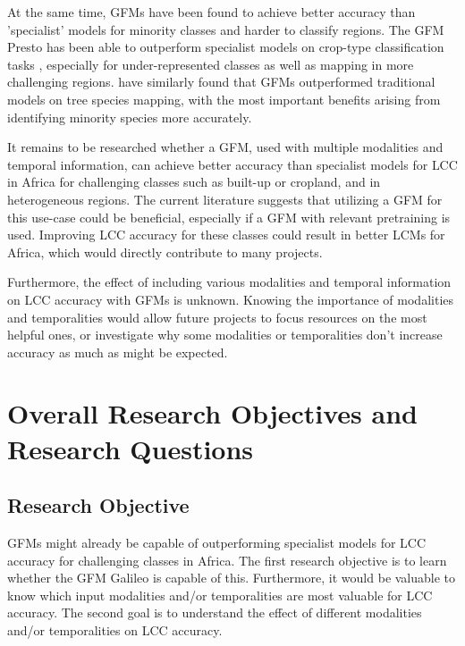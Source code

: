 \documentclass[a4paper,12pt]{article}
\begin{document}
At the same time, \acp{GFM} have been found to achieve better accuracy than 'specialist' models for minority classes and harder to classify regions. The \ac{GFM} Presto \citep{tsengLightweightPretrainedTransformers2024} has been able to outperform specialist models on crop-type classification tasks \citep{butskoDeployingGeospatialFoundation2025a}, especially for under-represented classes as well as mapping in more challenging regions. \citet{ballGeospatialFoundationModels2026} have similarly found that \acp{GFM} outperformed traditional models on tree species mapping, with the most important benefits arising from identifying minority species more accurately.

It remains to be researched whether a \ac{GFM}, used with multiple modalities and temporal information, can achieve better accuracy than specialist models for \ac{LCC} in Africa for challenging classes such as built-up or cropland, and in heterogeneous regions. The current literature suggests that utilizing a \ac{GFM} for this use-case could be beneficial, especially if a \ac{GFM} with relevant pretraining is used. Improving \ac{LCC} accuracy for these classes could result in better \acp{LCM} for Africa, which would directly contribute to many projects.

Furthermore, the effect of including various modalities and temporal information on \ac{LCC} accuracy with \acp{GFM} is unknown. Knowing the importance of modalities and temporalities would allow future projects to focus resources on the most helpful ones, or investigate why some modalities or temporalities don't increase accuracy as much as might be expected.

\section{Overall Research Objectives and Research Questions}

\subsection{Research Objective}

\acp{GFM} might already be capable of outperforming specialist models for \ac{LCC} accuracy for challenging classes in Africa. The first research objective is to learn whether the \ac{GFM} Galileo is capable of this. Furthermore, it would be valuable to know which input modalities and/or temporalities are most valuable for \ac{LCC} accuracy. The second goal is to understand the effect of different modalities and/or temporalities on \ac{LCC} accuracy.
\end{document}
